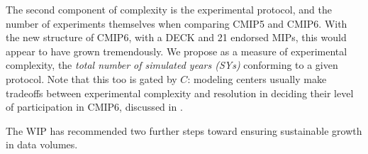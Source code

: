 \documentclass[gmd,manuscript]{copernicus}
\newcommand{\bibref}[1] { \cite{ref:#1}}
\begin{document}
\begin{description}
  The second component of complexity is the experimental protocol, and 
  the number of experiments themselves when comparing CMIP5 and CMIP6.
  With the new structure of CMIP6, with a DECK and 21 endorsed MIPs,
  this would appear to have grown tremendously. We propose as a
  measure of experimental complexity, the \emph{total number of 
  simulated years (SYs)} conforming to a given protocol. Note that
  this too is gated by $C$: modeling centers usually make tradeoffs
  between experimental complexity and resolution in deciding their
  level of participation in CMIP6, discussed in 
  \bibref{balajietal2017}.
\end{description}

The WIP has recommended two further steps toward ensuring sustainable
growth in data volumes.
\end{document}
